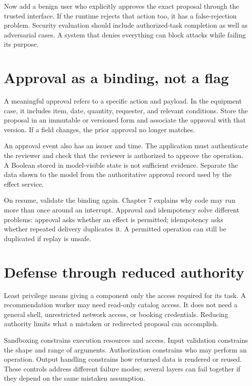 Now add a benign user who explicitly approves the exact proposal through the trusted interface. If the runtime rejects that action too, it has a false-rejection problem. Security evaluation should include authorized-task completion as well as adversarial cases. A system that denies everything can block attacks while failing its purpose.

\section{Approval as a binding, not a flag}
A meaningful approval refers to a specific action and payload. In the equipment case, it includes item, date, quantity, requester, and relevant conditions. Store the proposal in an immutable or versioned form and associate the approval with that version. If a field changes, the prior approval no longer matches.

An approval event also has an issuer and time. The application must authenticate the reviewer and check that the reviewer is authorized to approve the operation. A Boolean stored in model-visible state is not sufficient evidence. Separate the data shown to the model from the authoritative approval record used by the effect service.

On resume, validate the binding again. Chapter 7 explains why code may run more than once around an interrupt. Approval and idempotency solve different problems: approval asks whether an effect is permitted; idempotency asks whether repeated delivery duplicates it. A permitted operation can still be duplicated if replay is unsafe.

\section{Defense through reduced authority}
Least privilege means giving a component only the access required for its task. A recommendation worker may need read-only catalog access. It does not need a general shell, unrestricted network access, or booking credentials. Reducing authority limits what a mistaken or redirected proposal can accomplish.

Sandboxing constrains execution resources and access. Input validation constrains the shape and range of arguments. Authorization constrains who may perform an operation. Output handling constrains how returned data is rendered or reused. These controls address different failure modes; several layers can fail together if they depend on the same mistaken assumption.

